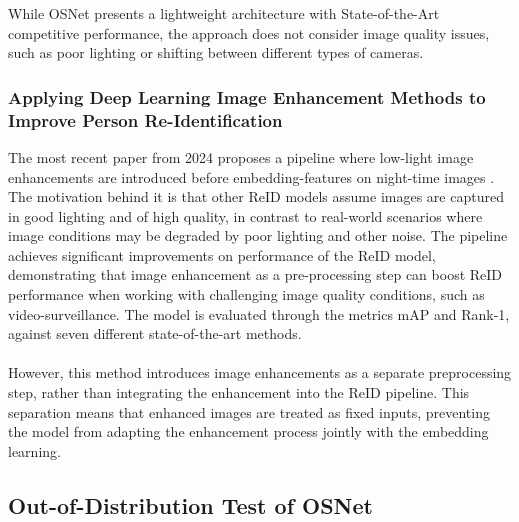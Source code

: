 \noindent While \acs{OSNet} presents a lightweight architecture with State-of-the-Art competitive performance, the approach does not consider image quality issues, such as poor lighting or shifting between different types of cameras. 

\subsubsection{Applying Deep Learning Image Enhancement Methods to Improve Person Re-Identification}
 
The most recent paper from 2024 proposes a pipeline where low-light image enhancements are introduced before embedding-features on night-time images \cite{enhancementimprovereid}. The motivation behind it is that other \acs{ReID} models assume images are captured in good lighting and of high quality, in contrast to real-world scenarios where image conditions may be degraded by poor lighting and other noise. The pipeline achieves significant improvements on performance of the \acs{ReID} model, demonstrating that image enhancement as a pre-processing step can boost \acs{ReID} performance when working with challenging image quality conditions, such as video-surveillance. The model is evaluated through the metrics \acs{mAP} and Rank-1, against seven different state-of-the-art methods.  
\\\\
However, this method introduces image enhancements as a separate preprocessing step, rather than integrating the enhancement into the \acs{ReID} pipeline. This separation means that enhanced images are treated as fixed inputs, preventing the model from adapting the enhancement process jointly with the embedding learning. 

\subsection{Out-of-Distribution Test of OSNet}\label{outofdistributiontest}

